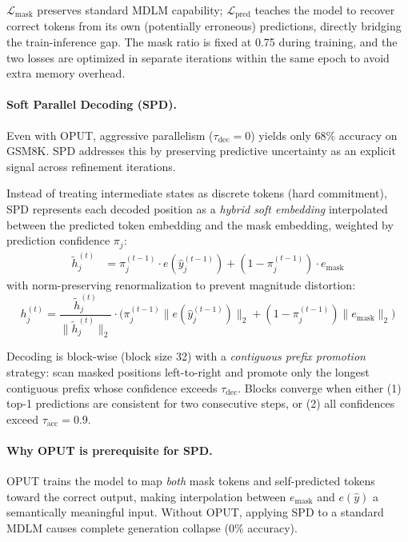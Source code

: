 \documentclass[11pt]{article}
\begin{document}
$\mathcal{L}_{\mathrm{mask}}$ preserves standard MDLM capability; $\mathcal{L}_{\mathrm{pred}}$ teaches the model to recover correct tokens from its own (potentially erroneous) predictions, directly bridging the train-inference gap. The mask ratio is fixed at 0.75 during training, and the two losses are optimized in separate iterations within the same epoch to avoid extra memory overhead.

\paragraph{Soft Parallel Decoding (SPD).}
Even with OPUT, aggressive parallelism ($\tau_{\mathrm{dec}} = 0$) yields only 68\% accuracy on GSM8K. SPD addresses this by preserving predictive uncertainty as an explicit signal across refinement iterations.

Instead of treating intermediate states as discrete tokens (hard commitment), SPD represents each decoded position as a \textit{hybrid soft embedding} interpolated between the predicted token embedding and the mask embedding, weighted by prediction confidence $\pi_j$:
\begin{align}
    \tilde{h}_{j}^{(t)} &= \pi_{j}^{(t-1)} \cdot e(\hat{y}_{j}^{(t-1)}) + (1 - \pi_{j}^{(t-1)}) \cdot e_{\mathrm{mask}}
\end{align}
with norm-preserving renormalization to prevent magnitude distortion:
\begin{equation}
    h_{j}^{(t)} = \frac{\tilde{h}_{j}^{(t)}}{\|\tilde{h}_{j}^{(t)}\|_2} \cdot \bigl(\pi_{j}^{(t-1)} \|e(\hat{y}_{j}^{(t-1)})\|_2 + (1 - \pi_{j}^{(t-1)}) \|e_{\mathrm{mask}}\|_2\bigr)
\end{equation}

Decoding is block-wise (block size 32) with a \textit{contiguous prefix promotion} strategy: scan masked positions left-to-right and promote only the longest contiguous prefix whose confidence exceeds $\tau_{\mathrm{dec}}$. Blocks converge when either (1) top-1 predictions are consistent for two consecutive steps, or (2) all confidences exceed $\tau_{\mathrm{acc}} = 0.9$.

\paragraph{Why OPUT is prerequisite for SPD.}
OPUT trains the model to map \textit{both} mask tokens and self-predicted tokens toward the correct output, making interpolation between $e_{\mathrm{mask}}$ and $e(\hat{y})$ a semantically meaningful input. Without OPUT, applying SPD to a standard MDLM causes complete generation collapse (0\% accuracy).
\end{document}
